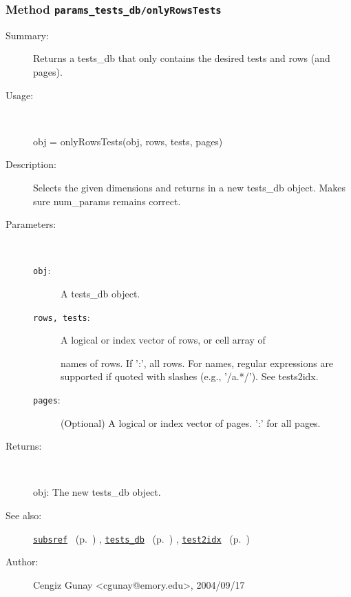 \subsubsection[Method \texttt{onlyRowsTests}]{Method \texttt{params\_tests\_db/onlyRowsTests}}%
%
\label{ref_params_tests_db__onlyRowsTests}%
\hypertarget{ref_params_tests_db__onlyRowsTests}{}%
\begin{description}
\item[Summary:]Returns a tests\_db that only contains the desired 
		tests and rows (and pages).
%
\item[Usage:]~%
\begin{lyxcode}%
obj = onlyRowsTests(obj, rows, tests, pages)
%
\end{lyxcode}%
%
\item[Description:]%
Selects the given dimensions and returns in a new tests\_db
 object. Makes sure num\_params remains correct.
\item[Parameters:]~
\begin{description}%
\item[\texttt{obj}:]
 A tests\_db object.
\item[\texttt{rows, tests}:]
 A logical or index vector of rows, or cell array of

names of rows. If ':', all rows. For names, regular expressions are
supported if quoted with slashes (e.g., '/a.*/'). See tests2idx.
\item[\texttt{pages}:]
 (Optional) A logical or index vector of pages. ':' for all pages.
\end{description}%
%
\item[Returns:
]~

	obj: The new tests\_db object.
%
%
\item[See also:]%
\hyperlink{ref_subsref}{\texttt{subsref}}%
\ (p.~\pageref{ref_subsref})%
%
, \hyperlink{ref_tests_db}{\texttt{tests\_db}}%
\ (p.~\pageref{ref_tests_db})%
%
, \hyperlink{ref_test2idx}{\texttt{test2idx}}%
\ (p.~\pageref{ref_test2idx})%
%
%
\item[Author:]%
Cengiz Gunay <cgunay@emory.edu>, 2004/09/17
%
\end{description}
\methodline%
